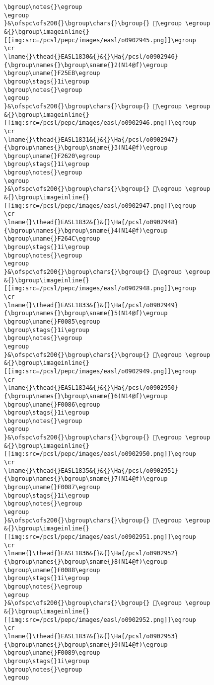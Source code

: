 \begin{verbatim}
\bgroup\notes{}\egroup
\egroup
}&\ofspc\ofs200{}\bgroup\chars{}\bgroup{} 󲖒\egroup \egroup
&{}\bgroup\imageinline{}[[img:src=/pcsl/pepc/images/easl/o0902945.png]]\egroup
\cr
\lname{}\thead{}EASL1830&{}&{}\Ha{/pcsl/o0902946}{\bgroup\names{}\bgroup\sname{}2(N14@f)\egroup
\bgroup\uname{}F25EB\egroup
\bgroup\stags{}1i\egroup
\bgroup\notes{}\egroup
\egroup
}&\ofspc\ofs200{}\bgroup\chars{}\bgroup{} 󲗫\egroup \egroup
&{}\bgroup\imageinline{}[[img:src=/pcsl/pepc/images/easl/o0902946.png]]\egroup
\cr
\lname{}\thead{}EASL1831&{}&{}\Ha{/pcsl/o0902947}{\bgroup\names{}\bgroup\sname{}3(N14@f)\egroup
\bgroup\uname{}F2620\egroup
\bgroup\stags{}1i\egroup
\bgroup\notes{}\egroup
\egroup
}&\ofspc\ofs200{}\bgroup\chars{}\bgroup{} 󲘠\egroup \egroup
&{}\bgroup\imageinline{}[[img:src=/pcsl/pepc/images/easl/o0902947.png]]\egroup
\cr
\lname{}\thead{}EASL1832&{}&{}\Ha{/pcsl/o0902948}{\bgroup\names{}\bgroup\sname{}4(N14@f)\egroup
\bgroup\uname{}F264C\egroup
\bgroup\stags{}1i\egroup
\bgroup\notes{}\egroup
\egroup
}&\ofspc\ofs200{}\bgroup\chars{}\bgroup{} 󲙌\egroup \egroup
&{}\bgroup\imageinline{}[[img:src=/pcsl/pepc/images/easl/o0902948.png]]\egroup
\cr
\lname{}\thead{}EASL1833&{}&{}\Ha{/pcsl/o0902949}{\bgroup\names{}\bgroup\sname{}5(N14@f)\egroup
\bgroup\uname{}F0085\egroup
\bgroup\stags{}1i\egroup
\bgroup\notes{}\egroup
\egroup
}&\ofspc\ofs200{}\bgroup\chars{}\bgroup{} 󰂅\egroup \egroup
&{}\bgroup\imageinline{}[[img:src=/pcsl/pepc/images/easl/o0902949.png]]\egroup
\cr
\lname{}\thead{}EASL1834&{}&{}\Ha{/pcsl/o0902950}{\bgroup\names{}\bgroup\sname{}6(N14@f)\egroup
\bgroup\uname{}F0086\egroup
\bgroup\stags{}1i\egroup
\bgroup\notes{}\egroup
\egroup
}&\ofspc\ofs200{}\bgroup\chars{}\bgroup{} 󰂆\egroup \egroup
&{}\bgroup\imageinline{}[[img:src=/pcsl/pepc/images/easl/o0902950.png]]\egroup
\cr
\lname{}\thead{}EASL1835&{}&{}\Ha{/pcsl/o0902951}{\bgroup\names{}\bgroup\sname{}7(N14@f)\egroup
\bgroup\uname{}F0087\egroup
\bgroup\stags{}1i\egroup
\bgroup\notes{}\egroup
\egroup
}&\ofspc\ofs200{}\bgroup\chars{}\bgroup{} 󰂇\egroup \egroup
&{}\bgroup\imageinline{}[[img:src=/pcsl/pepc/images/easl/o0902951.png]]\egroup
\cr
\lname{}\thead{}EASL1836&{}&{}\Ha{/pcsl/o0902952}{\bgroup\names{}\bgroup\sname{}8(N14@f)\egroup
\bgroup\uname{}F0088\egroup
\bgroup\stags{}1i\egroup
\bgroup\notes{}\egroup
\egroup
}&\ofspc\ofs200{}\bgroup\chars{}\bgroup{} 󰂈\egroup \egroup
&{}\bgroup\imageinline{}[[img:src=/pcsl/pepc/images/easl/o0902952.png]]\egroup
\cr
\lname{}\thead{}EASL1837&{}&{}\Ha{/pcsl/o0902953}{\bgroup\names{}\bgroup\sname{}9(N14@f)\egroup
\bgroup\uname{}F0089\egroup
\bgroup\stags{}1i\egroup
\bgroup\notes{}\egroup
\egroup

\end{verbatim}
